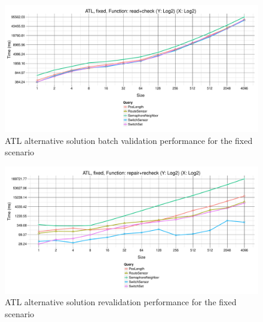 \documentclass[submission,copyright,creativecommons]{eptcs}
\begin{document}
\begin{figure}[ht]
\centerline{
\includegraphics[width=15cm]{figures/fixed-ATL-GroupBy-Query-time-batch-validation-alt}}
\caption{ATL alternative solution batch validation performance for the fixed scenario}
\label{fig:atl-batch-performance-alt}
\end{figure}

\begin{figure}[ht]
\centerline{
\includegraphics[width=15cm]{figures/fixed-ATL-GroupBy-Query-time-revalidation-alt}}
\caption{ATL alternative solution revalidation performance for the fixed scenario}
\label{fig:atl-recheck-performance-alt}
\end{figure}




\end{document}
